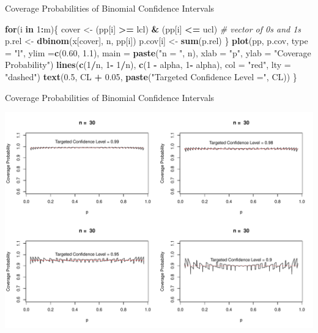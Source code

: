 \documentclass[
  ignorenonframetext,
]{beamer}
\newenvironment{Shaded}{\begin{snugshade}}{\end{snugshade}}
\newcommand{\AttributeTok}[1]{\textcolor[rgb]{0.13,0.29,0.53}{#1}}
\newcommand{\CommentTok}[1]{\textcolor[rgb]{0.56,0.35,0.01}{\textit{#1}}}
\newcommand{\ControlFlowTok}[1]{\textcolor[rgb]{0.13,0.29,0.53}{\textbf{#1}}}
\newcommand{\DecValTok}[1]{\textcolor[rgb]{0.00,0.00,0.81}{#1}}
\newcommand{\FloatTok}[1]{\textcolor[rgb]{0.00,0.00,0.81}{#1}}
\newcommand{\FunctionTok}[1]{\textcolor[rgb]{0.13,0.29,0.53}{\textbf{#1}}}
\newcommand{\NormalTok}[1]{#1}
\newcommand{\OtherTok}[1]{\textcolor[rgb]{0.56,0.35,0.01}{#1}}
\newcommand{\SpecialCharTok}[1]{\textcolor[rgb]{0.81,0.36,0.00}{\textbf{#1}}}
\newcommand{\StringTok}[1]{\textcolor[rgb]{0.31,0.60,0.02}{#1}}
\begin{document}
\begin{frame}[fragile]{Coverage Probabilities of Binomial Confidence
Intervals}
\begin{Shaded}
\begin{Highlighting}[]
\ControlFlowTok{for}\NormalTok{(i }\ControlFlowTok{in} \DecValTok{1}\SpecialCharTok{:}\NormalTok{m)\{}
\NormalTok{  cover }\OtherTok{\textless{}{-}}\NormalTok{ (pp[i] }\SpecialCharTok{\textgreater{}=}\NormalTok{ lcl) }\SpecialCharTok{\&}\NormalTok{ (pp[i] }\SpecialCharTok{\textless{}=}\NormalTok{ ucl)  }\CommentTok{\# vector of 0s and 1s}
\NormalTok{  p.rel }\OtherTok{\textless{}{-}} \FunctionTok{dbinom}\NormalTok{(x[cover], n, pp[i])}
\NormalTok{  p.cov[i] }\OtherTok{\textless{}{-}} \FunctionTok{sum}\NormalTok{(p.rel)}
\NormalTok{\}}
\FunctionTok{plot}\NormalTok{(pp, p.cov, }\AttributeTok{type =} \StringTok{"l"}\NormalTok{, }\AttributeTok{ylim =}\FunctionTok{c}\NormalTok{(}\FloatTok{0.60}\NormalTok{, }\FloatTok{1.1}\NormalTok{), }\AttributeTok{main =} \FunctionTok{paste}\NormalTok{(}\StringTok{"n = "}\NormalTok{, n), }
     \AttributeTok{xlab =} \StringTok{"p"}\NormalTok{, }\AttributeTok{ylab =} \StringTok{"Coverage Probability"}\NormalTok{)}
\FunctionTok{lines}\NormalTok{(}\FunctionTok{c}\NormalTok{(}\DecValTok{1}\SpecialCharTok{/}\NormalTok{n, }\DecValTok{1}\SpecialCharTok{{-}} \DecValTok{1}\SpecialCharTok{/}\NormalTok{n), }\FunctionTok{c}\NormalTok{(}\DecValTok{1} \SpecialCharTok{{-}}\NormalTok{ alpha, }\DecValTok{1}\SpecialCharTok{{-}}\NormalTok{ alpha), }\AttributeTok{col =} \StringTok{"red"}\NormalTok{, }\AttributeTok{lty =} \StringTok{"dashed"}\NormalTok{)}
      \FunctionTok{text}\NormalTok{(}\FloatTok{0.5}\NormalTok{, CL }\SpecialCharTok{+} \FloatTok{0.05}\NormalTok{, }\FunctionTok{paste}\NormalTok{(}\StringTok{"Targeted Confidence Level ="}\NormalTok{, CL))}
\NormalTok{\}}
\end{Highlighting}
\end{Shaded}

\normalsize
\end{frame}

\begin{frame}{Coverage Probabilities of Binomial Confidence Intervals}
\protect\hypertarget{coverage-probabilities-of-binomial-confidence-intervals-10}{}
\tiny

\begin{center}\includegraphics[width=0.9\linewidth,height=0.8\textheight]{Week11_12_13_files/figure-beamer/unnamed-chunk-21-1} \end{center}
\normalsize
\end{frame}
\end{document}
